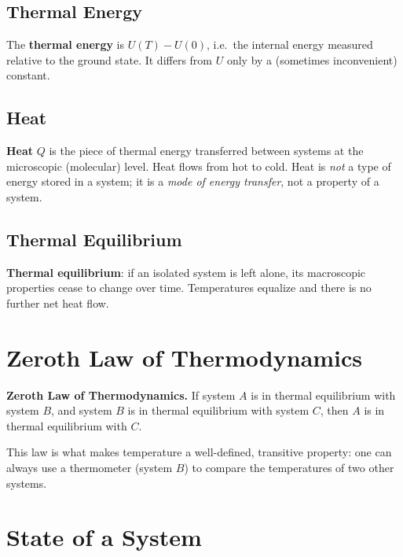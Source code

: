 \subsection{Thermal Energy}

\begin{definition}
The \textbf{thermal energy} is $U(T) - U(0)$, i.e.\ the internal energy measured relative to
the ground state. It differs from $U$ only by a (sometimes inconvenient) constant.
\end{definition}

\subsection{Heat}

\begin{definition}
\textbf{Heat} $Q$ is the piece of thermal energy transferred between systems at the microscopic
(molecular) level. Heat flows from hot to cold. Heat is \emph{not} a type of energy stored in
a system; it is a \emph{mode of energy transfer}, not a property of a system.
\end{definition}

\subsection{Thermal Equilibrium}

\begin{definition}
\textbf{Thermal equilibrium}: if an isolated system is left alone, its macroscopic properties
cease to change over time. Temperatures equalize and there is no further net heat flow.
\end{definition}

\section{Zeroth Law of Thermodynamics}

\begin{theorem}
\textbf{Zeroth Law of Thermodynamics.} If system $A$ is in thermal equilibrium with system $B$,
and system $B$ is in thermal equilibrium with system $C$, then $A$ is in thermal equilibrium
with $C$.
\end{theorem}

This law is what makes temperature a well-defined, transitive property: one can always use a
thermometer (system $B$) to compare the temperatures of two other systems.

\section{State of a System}

